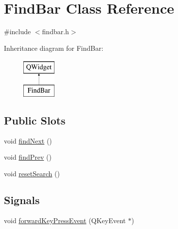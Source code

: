 \hypertarget{classFindBar}{\section{Find\+Bar Class Reference}
\label{classFindBar}
}


{\ttfamily \#include $<$findbar.\+h$>$}

Inheritance diagram for Find\+Bar\+:\begin{figure}[H]
\begin{center}
\leavevmode
\includegraphics[height=2.000000cm]{classFindBar}
\end{center}
\end{figure}
\subsection*{Public Slots}
\begin{DoxyCompactItemize}
\item 
void \hyperlink{classFindBar_a85079b0239e7015c666ca945c45e23eb}{find\+Next} ()
\item 
void \hyperlink{classFindBar_aad5bd8d73882a4000465f8e0ae6dc130}{find\+Prev} ()
\item 
void \hyperlink{classFindBar_a18c0f66ae9018a5e455771404a261872}{reset\+Search} ()
\end{DoxyCompactItemize}
\subsection*{Signals}
\begin{DoxyCompactItemize}
\item 
void \hyperlink{classFindBar_ab5a7c276ff972ba04ef4151f981f1610}{forward\+Key\+Press\+Event} (Q\+Key\+Event $\ast$)
\end{DoxyCompactItemize}
